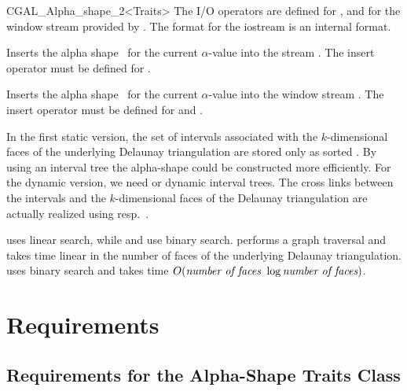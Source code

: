 \begin{ccClassTemplate} {CGAL_Alpha_shape_2<Traits>}
The I/O operators are defined for , and for
the window stream provided by \cgal. The format for the iostream
is an internal format. 


{Inserts the alpha shape \ccVar\ for the current $\alpha$-value into the stream .
\ccPrecond The insert operator must be defined for .}


{Inserts the alpha shape \ccVar\ for the current $\alpha$-value into the window stream .
\ccPrecond The insert operator must be defined for  and .}
\end{ccClassTemplate}

\ccImplementation
In the first static version, the set of intervals associated with the
$k$-dimensional faces of the underlying Delaunay triangulation are
stored only as sorted . By using an interval tree the
alpha-shape could be constructed more efficiently. For the dynamic
version, we need  or dynamic interval trees. The
cross links between the intervals and the $k$-dimensional faces of the
Delaunay triangulation are actually realized using
 resp.\ .

 uses linear search, while 
 and  
use binary search.
 performs a graph traversal and takes time linear in the number of faces of the underlying Delaunay triangulation.
 uses binary search and takes time
$O(\mbox{\em number of faces } \log{\mbox{\em number of faces}})$.


\section{Requirements\label{I1_SectRequirements}}


\subsection{Requirements for the Alpha-Shape Traits Class} 

